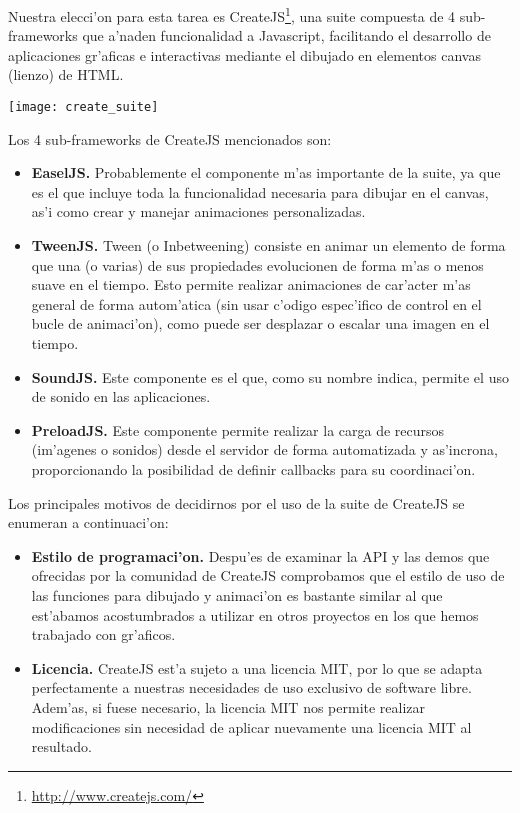 Nuestra elecci'on para esta tarea es CreateJS\footnote{\url{http://www.createjs.com/}}, una suite compuesta de 4 
sub-frameworks que a'naden funcionalidad a Javascript, facilitando el desarrollo de aplicaciones
gr'aficas e interactivas mediante el dibujado en elementos canvas (lienzo) de HTML.

\begin{center}
\texttt{[image: create\_suite]}
\end{center}

Los 4 sub-frameworks de CreateJS mencionados son:

\begin{itemize}
\item \textbf{EaselJS.} Probablemente el componente m'as importante de la suite, ya que es el que incluye
toda la funcionalidad necesaria para dibujar en el canvas, as'i como crear y manejar animaciones
personalizadas.
\item \textbf{TweenJS.} Tween (o Inbetweening) consiste en animar un elemento de forma que una (o varias)
de sus propiedades evolucionen de forma m'as o menos suave en el tiempo. Esto permite realizar
animaciones de car'acter m'as general de forma autom'atica (sin usar c'odigo espec'ifico de 
control en el bucle de animaci'on), como puede ser desplazar o escalar una imagen en el tiempo.
\item \textbf{SoundJS.} Este componente es el que, como su nombre indica, permite el uso de sonido en las
aplicaciones.
\item \textbf{PreloadJS.} Este componente permite realizar la carga de recursos (im'agenes o sonidos) desde
el servidor de forma automatizada y as'incrona, proporcionando la posibilidad de definir callbacks
para su coordinaci'on.
\end{itemize}

Los principales motivos de decidirnos por el uso de la suite de CreateJS se enumeran a continuaci'on:

\begin{itemize}
\item \textbf{Estilo de programaci'on.} Despu'es de examinar la API y las demos que ofrecidas por la 
comunidad de CreateJS comprobamos que el estilo de uso de las funciones para dibujado y animaci'on
es bastante similar al que est'abamos acostumbrados a utilizar en otros proyectos en los que 
hemos trabajado con gr'aficos.
\item \textbf{Licencia.} CreateJS est'a sujeto a una licencia MIT, por lo que se adapta perfectamente a 
nuestras necesidades de uso exclusivo de software libre. Adem'as, si fuese necesario, la licencia
MIT nos permite realizar modificaciones sin necesidad de aplicar nuevamente una licencia MIT al 
resultado.
\end{itemize}

